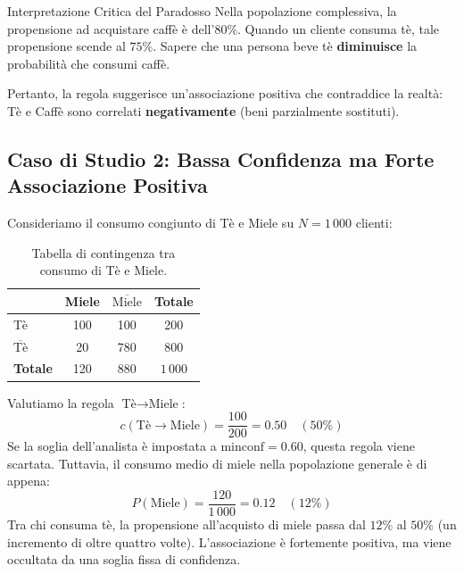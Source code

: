 \begin{noteblock}{Interpretazione Critica del Paradosso}
    Nella popolazione complessiva, la propensione ad acquistare caffè è dell'$80\%$. Quando un cliente consuma tè, tale propensione scende al $75\%$. Sapere che una persona beve tè \textbf{diminuisce} la probabilità che consumi caffè.
    
    Pertanto, la regola suggerisce un'associazione positiva che contraddice la realtà: Tè e Caffè sono correlati \textbf{negativamente} (beni parzialmente sostituti).
\end{noteblock}

\FloatBarrier
\subsection{Caso di Studio 2: Bassa Confidenza ma Forte Associazione Positiva}
Consideriamo il consumo congiunto di Tè e Miele su $N = 1\,000$ clienti:

\begin{table}[H]
\centering
\small
\renewcommand{\arraystretch}{1.2}
\begin{tabular}{l c c c}
\toprule
& Miele & $\overline{\text{Miele}}$ & \textbf{Totale} \\
\midrule
Tè & 100 & 100 & 200 \\
$\overline{\text{Tè}}$ & 20 & 780 & 800 \\
\midrule
\textbf{Totale} & 120 & 880 & $1\,000$ \\
\bottomrule
\end{tabular}
\caption{Tabella di contingenza tra consumo di Tè e Miele.}
\label{tab:dm-tea-honey-paradox}
\end{table}

Valutiamo la regola $\text{Tè} \longrightarrow \text{Miele}$:
\begin{equation}
c(\text{Tè} \longrightarrow \text{Miele}) = \frac{100}{200} = 0.50 \quad (50\%)
\end{equation}
Se la soglia dell'analista è impostata a $\mathrm{minconf} = 0.60$, questa regola viene scartata. Tuttavia, il consumo medio di miele nella popolazione generale è di appena:
\begin{equation}
P(\text{Miele}) = \frac{120}{1\,000} = 0.12 \quad (12\%)
\end{equation}
Tra chi consuma tè, la propensione all'acquisto di miele passa dal $12\%$ al $50\%$ (un incremento di oltre quattro volte). L'associazione è fortemente positiva, ma viene occultata da una soglia fissa di confidenza.

